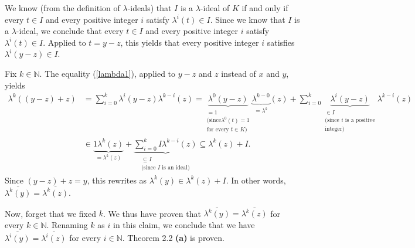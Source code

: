 \documentclass[numbers=enddot,12pt,final,onecolumn,notitlepage]{scrartcl}%
\begin{document}
We know (from the definition of $\lambda$-ideals) that $I$ is a $\lambda
$-ideal of $K$ if and only if every $t\in I$ and every positive integer $i$
satisfy $\lambda^{i}\left(  t\right)  \in I$. Since we know that $I$ is a
$\lambda$-ideal, we conclude that every $t\in I$ and every positive integer
$i$ satisfy $\lambda^{i}\left(  t\right)  \in I$. Applied to $t=y-z$, this
yields that every positive integer $i$ satisfies $\lambda^{i}\left(
y-z\right)  \in I$.

Fix $k\in\mathbb{N}$. The equality (\ref{lambda1}), applied to $y-z$ and $z$
instead of $x$ and $y$, yields%
\begin{align*}
\lambda^{k}\left(  \left(  y-z\right)  +z\right)   &  =\sum_{i=0}^{k}%
\lambda^{i}\left(  y-z\right)  \lambda^{k-i}\left(  z\right)
=\underbrace{\lambda^{0}\left(  y-z\right)  }_{\substack{=1\\\text{(since
}\lambda^{0}\left(  t\right)  =1\\\text{for every }t\in K\text{)}%
}}\underbrace{\lambda^{k-0}}_{=\lambda^{k}}\left(  z\right)  +\sum_{i=0}%
^{k}\underbrace{\lambda^{i}\left(  y-z\right)  }_{\substack{\in
I\\\text{(since }i\text{ is a positive}\\\text{integer)}}}\lambda^{k-i}\left(
z\right) \\
&  \in\underbrace{1\lambda^{k}\left(  z\right)  }_{=\lambda^{k}\left(
z\right)  }+\underbrace{\sum_{i=0}^{k}I\lambda^{k-i}\left(  z\right)
}_{\substack{\subseteq I\\\text{(since }I\text{ is an ideal)}}}\subseteq
\lambda^{k}\left(  z\right)  +I.
\end{align*}
Since $\left(  y-z\right)  +z=y$, this rewrites as $\lambda^{k}\left(
y\right)  \in\lambda^{k}\left(  z\right)  +I$. In other words, $\overline
{\lambda^{k}\left(  y\right)  }=\overline{\lambda^{k}\left(  z\right)  }$.

Now, forget that we fixed $k$. We thus have proven that $\overline{\lambda
^{k}\left(  y\right)  }=\overline{\lambda^{k}\left(  z\right)  }$ for every
$k\in\mathbb{N}$. Renaming $k$ as $i$ in this claim, we conclude that we have
$\overline{\lambda^{i}\left(  y\right)  }=\overline{\lambda^{i}\left(
z\right)  }$ for every $i\in\mathbb{N}$. Theorem 2.2 \textbf{(a)} is proven.
\end{document}
